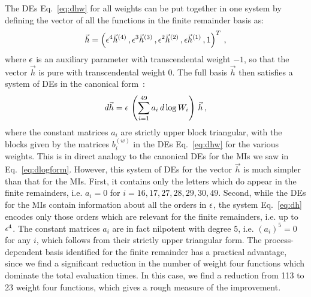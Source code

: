 \documentclass[main.tex]{subfiles}
\begin{document}
The DEs Eq.~\ref{eq:dhw} for all weights can be put together in one system by defining the vector of all the functions in the finite remainder basis as:
\begin{align}
\vec{h} = \left( \epsilon^4 \vec{h}^{(4)}\,, \epsilon^3 \vec{h}^{(3)}\,, \epsilon^2 \vec{h}^{(2)} \,, \epsilon \vec{h}^{(1)} \,, 1 \right)^T \,,
\end{align}
where $\epsilon$ is an auxiliary parameter with transcendental weight $-1$, so that the vector $\vec{h}$ is pure with transcendental weight $0$. The full basis $\vec{h}$ then satisfies a system of DEs in the canonical form~\cite{Henn:2013pwa}:
\begin{align} \label{eq:dh}
d \vec{h} = \epsilon \, \left(  \sum_{i=1}^{49} a_i \, d\log W_i \right) \, \vec{h} \,,
\end{align}
where the constant matrices $a_i$ are strictly upper block triangular, with the blocks given by the matrices $b_i^{(w)}$ in the DEs Eq.~\ref{eq:dhw} for the various weights. This is in direct analogy to the canonical DEs for the MIs we saw in Eq.~\ref{eq:dlogform}.
However, this system of DEs for the vector $\vec{h}$ is much simpler than that for the MIs. First, it contains only the letters which do appear in the finite remainders, i.e. $a_i = 0$ for $i=16,17,27,28,29,30,49$. Second, while the DEs for the MIs contain information about all the orders in $\epsilon$, the system Eq.~\ref{eq:dh} encodes only those orders which are relevant for the finite remainders, i.e. up to $\epsilon^4$. The constant matrices $a_i$ are in fact nilpotent with degree $5$, i.e. $(a_i)^5 = 0$ for any $i$, which follows from their strictly upper triangular form. The process-dependent basis identified for the finite remainder has a practical advantage, since we find a significant reduction in the number of weight four functions which dominate the total evaluation times. In this case, we find a reduction from 113 to 23 weight four functions, which gives a rough measure of the improvement.
\end{document}
